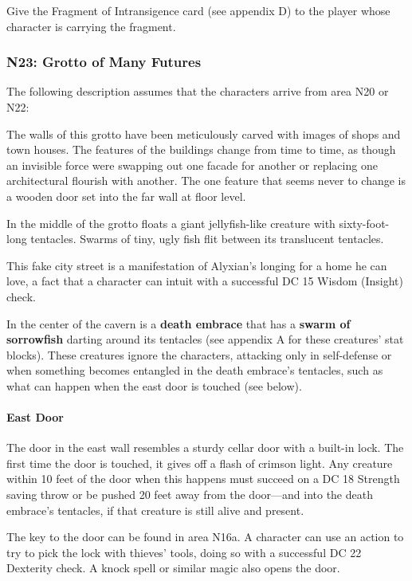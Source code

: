 \documentclass[10pt,a4paper,twoside,bg=print,twocolumn,openany,nodeprecatedcode]{dndbook}
\begin{document}
Give the Fragment of Intransigence card (see appendix D) to the player whose character is carrying the fragment.


\subsubsection{N23: Grotto of Many Futures}
The following description assumes that the characters arrive from area N20 or N22:

\begin{DndReadAloud}{}
The walls of this grotto have been meticulously carved with images of shops and town houses. The features of the buildings change from time to time, as though an invisible force were swapping out one facade for another or replacing one architectural flourish with another. The one feature that seems never to change is a wooden door set into the far wall at floor level.

In the middle of the grotto floats a giant jellyfish-like creature with sixty-foot-long tentacles. Swarms of tiny, ugly fish flit between its translucent tentacles.

\end{DndReadAloud}


This fake city street is a manifestation of Alyxian's longing for a home he can love, a fact that a character can intuit with a successful DC 15 Wisdom (Insight) check.

In the center of the cavern is a \textbf{death embrace} that has a \textbf{swarm of sorrowfish} darting around its tentacles (see appendix A for these creatures' stat blocks). These creatures ignore the characters, attacking only in self-defense or when something becomes entangled in the death embrace's tentacles, such as what can happen when the east door is touched (see below).

\paragraph{East Door}
The door in the east wall resembles a sturdy cellar door with a built-in lock. The first time the door is touched, it gives off a flash of crimson light. Any creature within 10 feet of the door when this happens must succeed on a DC 18 Strength saving throw or be pushed 20 feet away from the door—and into the death embrace's tentacles, if that creature is still alive and present.

The key to the door can be found in area N16a. A character can use an action to try to pick the lock with thieves' tools, doing so with a successful DC 22 Dexterity check. A knock spell or similar magic also opens the door.
\end{document}
